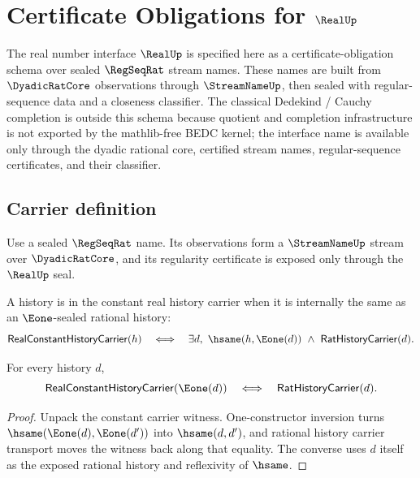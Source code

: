 \chapter{Certificate Obligations for $\RealUp$}
\label{ch:concrete-instances-real-namecert}

The real number interface $\RealUp$ is specified here as a certificate-obligation schema over sealed $\RegSeqRat$ stream names. These names are built from $\DyadicRatCore$ observations through $\StreamNameUp$, then sealed with regular-sequence data and a closeness classifier. The classical Dedekind / Cauchy completion is outside this schema because quotient and completion infrastructure is not exported by the mathlib-free BEDC kernel; the interface name is available only through the dyadic rational core, certified stream names, regular-sequence certificates, and their classifier.

\section{Carrier definition}

\begin{definition}
\label{def:real-carrier}
Use a sealed $\RegSeqRat$ name. Its observations form a $\StreamNameUp$ stream over $\DyadicRatCore$, and its regularity certificate is exposed only through the $\RealUp$ seal.
\end{definition}

\begin{definition}
\label{def:real-constant-history-carrier}
A history is in the constant real history carrier when it is internally the same as an $\Eone$-sealed rational history:
$$
\mathsf{RealConstantHistoryCarrier}(h)
\quad\Longleftrightarrow\quad
\exists d,\ \hsame(h,\Eone(d))\ \wedge\ \mathsf{RatHistoryCarrier}(d).
$$
\end{definition}

\begin{theorem}
\label{thm:real-constant-history-carrier-e1-iff-rat}
For every history $d$,
$$
\mathsf{RealConstantHistoryCarrier}(\Eone(d))
\quad\Longleftrightarrow\quad
\mathsf{RatHistoryCarrier}(d).
$$
\end{theorem}
\begin{proof}
Unpack the constant carrier witness. One-constructor inversion turns
$\hsame(\Eone(d),\Eone(d'))$ into $\hsame(d,d')$, and rational history carrier
transport moves the witness back along that equality. The converse uses $d$
itself as the exposed rational history and reflexivity of $\hsame$.
\end{proof}

